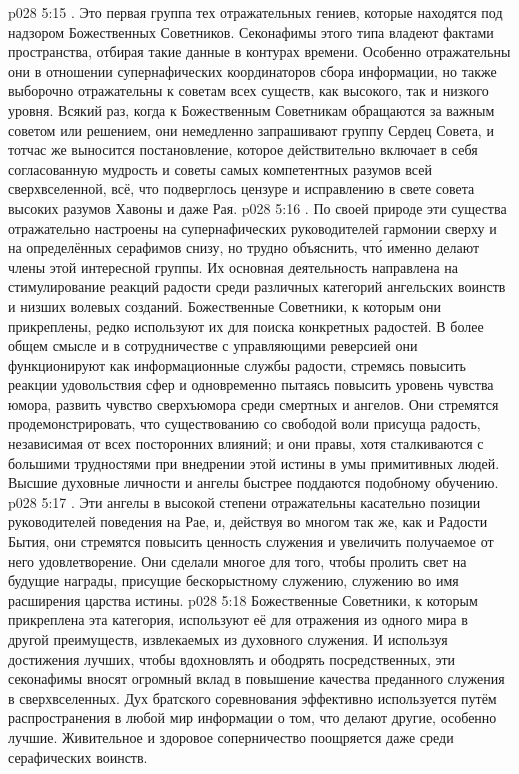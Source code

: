 \vs p028 5:15 . Это первая группа тех отражательных гениев, которые находятся под надзором Божественных Советников. Секонафимы этого типа владеют фактами пространства, отбирая такие данные в контурах времени. Особенно отражательны они в отношении супернафических координаторов сбора информации, но также выборочно отражательны к советам всех существ, как высокого, так и низкого уровня. Всякий раз, когда к Божественным Советникам обращаются за важным советом или решением, они немедленно запрашивают группу Сердец Совета, и тотчас же выносится постановление, которое действительно включает в себя согласованную мудрость и советы самых компетентных разумов всей сверхвселенной, всё, что подверглось цензуре и исправлению в свете совета высоких разумов Хавоны и даже Рая.
\vs p028 5:16 . По своей природе эти существа отражательно настроены на супернафических руководителей гармонии сверху и на определённых серафимов снизу, но трудно объяснить, чт\'о именно делают члены этой интересной группы. Их основная деятельность направлена на стимулирование реакций радости среди различных категорий ангельских воинств и низших волевых созданий. Божественные Советники, к которым они прикреплены, редко используют их для поиска конкретных радостей. В более общем смысле и в сотрудничестве с управляющими реверсией они функционируют как информационные службы радости, стремясь повысить реакции удовольствия сфер и одновременно пытаясь повысить уровень чувства юмора, развить чувство сверхъюмора среди смертных и ангелов. Они стремятся продемонстрировать, что существованию со свободой воли присуща радость, независимая от всех посторонних влияний; и они правы, хотя сталкиваются с большими трудностями при внедрении этой истины в умы примитивных людей. Высшие духовные личности и ангелы быстрее поддаются подобному обучению.
\vs p028 5:17 . Эти ангелы в высокой степени отражательны касательно позиции руководителей поведения на Рае, и, действуя во многом так же, как и Радости Бытия, они стремятся повысить ценность служения и увеличить получаемое от него удовлетворение. Они сделали многое для того, чтобы пролить свет на будущие награды, присущие бескорыстному служению, служению во имя расширения царства истины.
\vs p028 5:18 Божественные Советники, к которым прикреплена эта категория, используют её для отражения из одного мира в другой преимуществ, извлекаемых из духовного служения. И используя достижения лучших, чтобы вдохновлять и ободрять посредственных, эти секонафимы вносят огромный вклад в повышение качества преданного служения в сверхвселенных. Дух братского соревнования эффективно используется путём распространения в любой мир информации о том, что делают другие, особенно лучшие. Живительное и здоровое соперничество поощряется даже среди серафических воинств.
